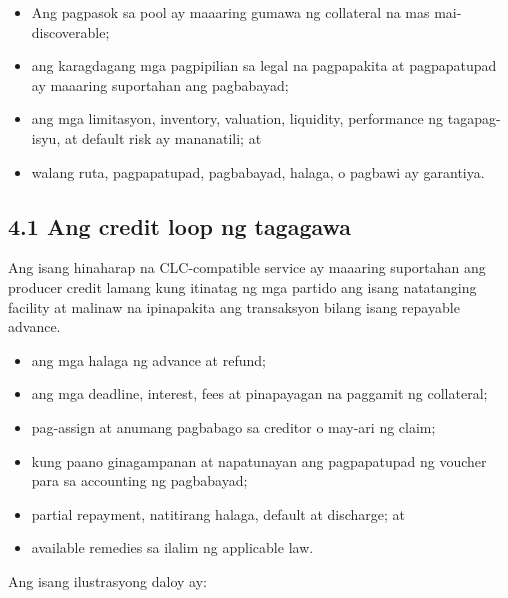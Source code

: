 \documentclass[11pt]{article}
\begin{document}
\begin{itemize}[leftmargin=*]
\item Ang pagpasok sa pool ay maaaring gumawa ng collateral na mas mai-discoverable;
\item ang karagdagang mga pagpipilian sa legal na pagpapakita at pagpapatupad ay maaaring suportahan ang pagbabayad;
\item ang mga limitasyon, inventory, valuation, liquidity, performance ng tagapag-isyu, at default risk ay mananatili; at
\item walang ruta, pagpapatupad, pagbabayad, halaga, o pagbawi ay garantiya.
\end{itemize}
\subsection*{4.1 Ang credit loop ng tagagawa}

Ang isang hinaharap na CLC-compatible service ay maaaring suportahan ang producer credit lamang kung itinatag ng mga partido ang isang natatanging facility at malinaw na ipinapakita ang transaksyon bilang isang repayable advance.

\begin{itemize}[leftmargin=*]
\item ang mga halaga ng advance at refund;
\item ang mga deadline, interest, fees at pinapayagan na paggamit ng collateral;
\item pag-assign at anumang pagbabago sa creditor o may-ari ng claim;
\item kung paano ginagampanan at napatunayan ang pagpapatupad ng voucher para sa accounting ng pagbabayad;
\item partial repayment, natitirang halaga, default at discharge; at
\item available remedies sa ilalim ng applicable law.
\end{itemize}
Ang isang ilustrasyong daloy ay:
\end{document}
